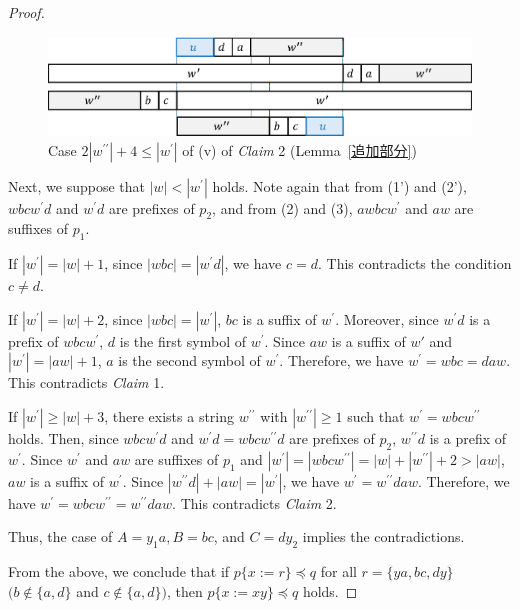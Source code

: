 \begin{proof}
\begin{figure}[t]
  \begin{center}
    \includegraphics[scale=0.45]{figs/w=2w_1+4.eps}
    \caption{Case $2|w^{\prime\prime}| + 4 \leq |w^{\prime}|$ of (v) of \textit{Claim} 2 (Lemma~\ref{追加部分})}\label{2w1+5}
  \end{center}
\end{figure}
    
  Next, we suppose that $|w| < |w^{\prime}|$ holds.
  Note again that from (1') and (2'), $wbcw^{\prime}d$ and $w^{\prime}d$ are prefixes of $p_{2}$, and from (2) and (3), $awbcw^{\prime}$ and $aw$ are suffixes of $p_{1}$.
  
  If $|w^{\prime}|=|w|+1$, since $|wbc|=|w^{\prime}d|$, we have $c=d$. This contradicts the condition $c \ne d$.
  
  If $|w^{\prime}|=|w|+2$, since $|wbc|=|w^{\prime}|$, $bc$ is a suffix of $w^{\prime}$.
  Moreover, since $w^{\prime}d$ is a prefix of $wbcw^{\prime}$, $d$ is the first symbol of $w^{\prime}$.
  Since $aw$ is a suffix of $w'$ and $|w^{\prime}|=|aw|+1$, $a$ is the second symbol of $w^{\prime}$.
  Therefore, we have $w^{\prime}=wbc=daw$.
  This contradicts \textit{Claim} 1.
  
  If $|w^{\prime}| \ge |w|+3$, there exists a string $w^{\prime\prime}$ with $|w^{\prime\prime}| \geq 1$ such that $w^{\prime} = wbcw^{\prime\prime}$ holds.
  Then, since $wbcw^{\prime}d$ and $w^{\prime}d=wbcw^{\prime\prime}d$ are prefixes of $p_{2}$, $w^{\prime\prime}d$ is a prefix of $w^{\prime}$.
  Since $w^{\prime}$ and $aw$ are suffixes of $p_{1}$ and $|w^{\prime}|=|wbcw^{\prime\prime}|=|w|+|w^{\prime\prime}|+2 > |aw|$, $aw$ is a suffix of $w^{\prime}$.
  Since $|w^{\prime\prime}d| + |aw| = |w^{\prime}|$, we have $w^{\prime} = w^{\prime\prime}daw$.
  Therefore, we have $w^{\prime}=wbcw^{\prime\prime}=w^{\prime\prime}daw$.
  This contradicts \textit{Claim} 2.

  Thus, the case of $A=y_{1}a,B=bc$, and $C=dy_{2}$ implies the contradictions.
  
  From the above, we conclude that if $p \{ x := r \} \preceq q$ for all $r = \{ ya, bc, dy \}$ $(b \not\in \{a,d\}$ and $c \not\in \{a,d\})$, then $p \{ x := xy \} \preceq q$ holds.
  \end{proof}

